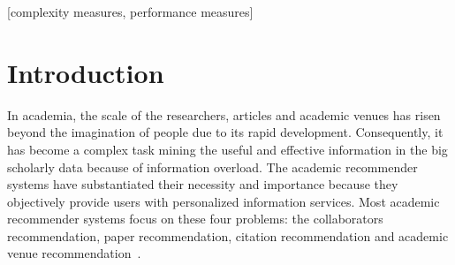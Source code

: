 \documentclass[9pt]{acm_proc_article-sp}
\begin{document}
\maketitle
\begin{abstract}
In academia, venue paly the main platforms of academic community and the bridge of connecting researchers, which have rapidly developed in recent years. Consequently, It becomes complex as a result of information overload in the big scholarly data for researchers to keep concerns on high-quality and fruitful academic venues, participate in relevant academic conferences and contribute to influential journals. In this work, we propose AVERec, a novel random walk based academic venue recommendation model. AVERec builds the co-publishing network with two kinds of associations, i.e. co-author relations and author-venue relations. We exploit three academic factors to define a transfer matrix with bias which drives a random walk with restart model running on the co-publishing network. The three academic factors, i.e. co-publishing frequency, weight of relations and similar-level preferred, are inspired by that, researchers are more likely to contact with those who have high co-publishing frequency and similar academic level with them, as well as the weight of the two kinds of associations should be differentiated. We conduct extensive experiments on DBLP data set in order to measure AVERec. The results demonstrate that AVERec significantly improves the performance on precision, recall and F1 when compared to the baseline approaches.
\end{abstract}

[complexity measures, performance measures]



\section{Introduction}
In academia, the scale of the researchers, articles and academic venues has risen beyond the imagination of people due to its rapid development. Consequently, it has become a complex task mining the useful and effective information in the big scholarly data because of information overload. The academic recommender systems have substantiated their necessity and importance because they objectively provide users with personalized information services. Most academic recommender systems focus on these four problems: the collaborators recommendation, paper recommendation, citation recommendation and academic venue recommendation~\cite{yang2014recommendation}.
\end{document}
